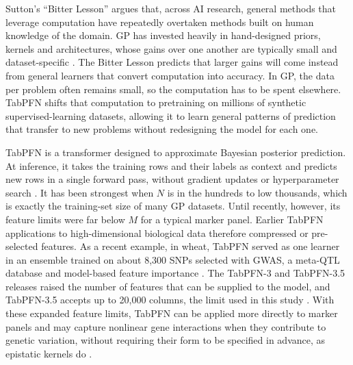 \documentclass[11pt]{article}
\begin{document}
Sutton's ``Bitter Lesson'' \citep{sutton2019} argues that, across AI research, general methods that leverage computation have repeatedly overtaken methods built on human knowledge of the domain. GP has invested heavily in hand-designed priors, kernels and architectures, whose gains over one another are typically small and dataset-specific \citep{azodi2019,quesadatraver2025}. The Bitter Lesson predicts that larger gains will come instead from general learners that convert computation into accuracy. In GP, the data per problem often remains small, so the computation has to be spent elsewhere. TabPFN shifts that computation to pretraining on millions of synthetic supervised-learning datasets, allowing it to learn general patterns of prediction that transfer to new problems without redesigning the model for each one.

TabPFN is a transformer designed to approximate Bayesian posterior prediction. At inference, it takes the training rows and their labels as context and predicts new rows in a single forward pass, without gradient updates or hyperparameter search \citep{muller2022,hollmann2023,hollmann2025}. It has been strongest when $N$ is in the hundreds to low thousands, which is exactly the training-set size of many GP datasets. Until recently, however, its feature limits were far below $M$ for a typical marker panel. Earlier TabPFN applications to high-dimensional biological data therefore compressed or pre-selected features. As a recent example, in wheat, TabPFN served as one learner in an ensemble trained on about 8,300 SNPs selected with GWAS, a meta-QTL database and model-based feature importance \citep{ren2025}. The TabPFN-3 and TabPFN-3.5 releases raised the number of features that can be supplied to the model, and TabPFN-3.5 accepts up to 20,000 columns, the limit used in this study \citep{priorlabs2026a,priorlabs2026b,priorlabs2026c}. With these expanded feature limits, TabPFN can be applied more directly to marker panels and may capture nonlinear gene interactions when they contribute to genetic variation, without requiring their form to be specified in advance, as epistatic kernels do \citep{jiang2015}.
\end{document}
